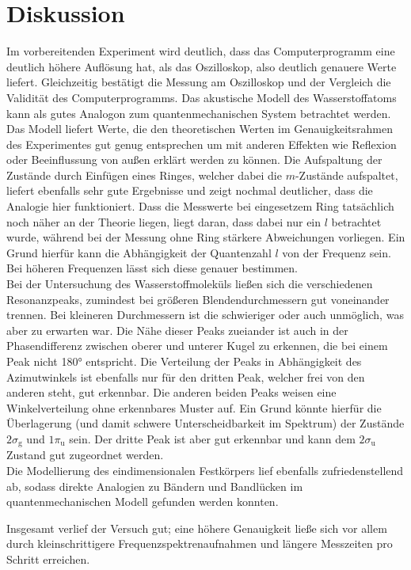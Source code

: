 \section{Diskussion}
Im vorbereitenden Experiment wird deutlich, dass das Computerprogramm eine deutlich höhere
Auflösung hat, als das Oszilloskop, also deutlich genauere Werte liefert. Gleichzeitig
bestätigt die Messung am Oszilloskop und der Vergleich die Validität des Computerprogramms.
Das akustische Modell des Wasserstoffatoms kann als gutes Analogon zum quantenmechanischen 
System betrachtet werden. Das Modell liefert Werte, die 
den theoretischen Werten im Genauigkeitsrahmen des Experimentes gut genug entsprechen um mit
anderen Effekten wie Reflexion oder Beeinflussung von außen erklärt werden zu können.
Die Aufspaltung der Zustände durch Einfügen eines Ringes, welcher dabei die $m$-Zustände aufspaltet,
liefert ebenfalls sehr gute Ergebnisse
und zeigt nochmal deutlicher, dass die Analogie hier funktioniert. Dass die Messwerte bei 
eingesetzem Ring tatsächlich noch näher an der Theorie liegen, liegt daran, dass dabei nur 
ein $l$ betrachtet wurde, während bei der Messung ohne Ring stärkere Abweichungen vorliegen.
Ein Grund hierfür kann die Abhängigkeit der Quantenzahl $l$ von der Frequenz sein. Bei höheren
Frequenzen lässt sich diese genauer bestimmen.\\
Bei der Untersuchung des Wasserstoffmoleküls ließen sich die verschiedenen Resonanzpeaks,
zumindest bei größeren Blendendurchmessern gut voneinander trennen. Bei kleineren Durchmessern
ist die schwieriger oder auch unmöglich, was aber zu erwarten war. 
Die Nähe dieser Peaks zueiander ist auch in der Phasendifferenz zwischen oberer und unterer
Kugel zu erkennen, die bei einem Peak nicht 180$°$ entspricht. Die Verteilung der Peaks 
in Abhängigkeit des Azimutwinkels ist ebenfalls nur für den dritten Peak, welcher frei von den anderen steht,
gut erkennbar. Die anderen beiden Peaks weisen eine Winkelverteilung ohne erkennbares Muster
auf. Ein Grund könnte hierfür die Überlagerung (und damit schwere Unterscheidbarkeit im Spektrum)
der Zustände $2 \sigma_{\text{g}}$ und $1 \pi_{\text{u}}$ sein. Der dritte Peak ist aber gut erkennbar und kann 
dem $2 \sigma_{\text{u}}$ Zustand gut zugeordnet werden. \\
Die Modellierung des eindimensionalen Festkörpers lief ebenfalls zufriedenstellend ab, sodass 
direkte Analogien zu Bändern und Bandlücken im quantenmechanischen Modell gefunden werden konnten.

Insgesamt verlief der Versuch gut; eine höhere Genauigkeit ließe sich vor allem durch 
kleinschrittigere Frequenzspektrenaufnahmen und längere Messzeiten pro Schritt erreichen.
